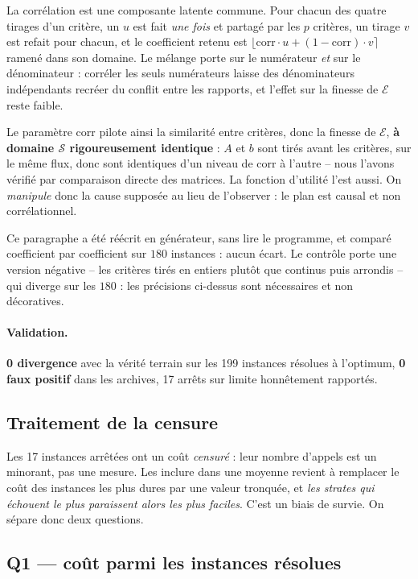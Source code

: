 \documentclass[11pt,a4paper]{article}
\theoremstyle{plain}
\theoremstyle{remark}
\newcommand{\Ecal}{\mathcal{E}}
\newcommand{\Scal}{\mathcal{S}}
\begin{document}
La corrélation est une composante latente commune. Pour chacun des quatre
tirages d'un critère, un $u$ est fait \emph{une fois} et partagé par les
$p$ critères, un tirage $v$ est refait pour chacun, et le coefficient retenu
est $\lfloor\text{corr}\cdot u+(1-\text{corr})\cdot v\rceil$ ramené dans son
domaine. Le mélange porte sur le numérateur \emph{et} sur le dénominateur :
corréler les seuls numérateurs laisse des dénominateurs indépendants
recréer du conflit entre les rapports, et l'effet sur la finesse de $\Ecal$
reste faible.

Le paramètre $\text{corr}$ pilote ainsi la similarité entre critères, donc la
finesse de $\Ecal$, \textbf{à domaine $\Scal$ rigoureusement identique} : $A$
et $b$ sont tirés avant les critères, sur le même flux, donc sont identiques
d'un niveau de $\text{corr}$ à l'autre -- nous l'avons vérifié par
comparaison directe des matrices. La fonction d'utilité l'est aussi. On
\emph{manipule} donc la cause supposée au lieu de l'observer : le plan est
causal et non corrélationnel.

Ce paragraphe a été réécrit en générateur, sans lire le programme, et
comparé coefficient par coefficient sur $180$ instances : aucun écart. Le
contrôle porte une version négative -- les critères tirés en entiers plutôt
que continus puis arrondis -- qui diverge sur les $180$ : les précisions
ci-dessus sont nécessaires et non décoratives.

\paragraph{Validation.} \textbf{0 divergence} avec la vérité terrain sur les
199 instances résolues à l'optimum, \textbf{0 faux positif} dans les
archives, 17 arrêts sur limite honnêtement rapportés.

\subsection{Traitement de la censure}

Les 17 instances arrêtées ont un coût \emph{censuré} : leur nombre d'appels
est un minorant, pas une mesure. Les inclure dans une moyenne revient à
remplacer le coût des instances les plus dures par une valeur tronquée, et
\emph{les strates qui échouent le plus paraissent alors les plus faciles}.
C'est un biais de survie. On sépare donc deux questions.

\subsection{Q1 --- coût parmi les instances résolues}
\end{document}
